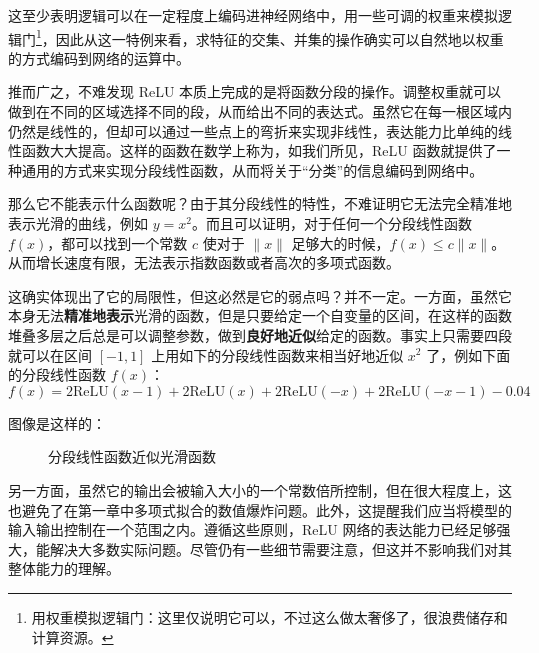 这至少表明逻辑可以在一定程度上编码进神经网络中，用一些可调的权重来模拟逻辑门\footnote{用权重模拟逻辑门：这里仅说明它可以，不过这么做太奢侈了，很浪费储存和计算资源。}，因此从这一特例来看，求特征的交集、并集的操作确实可以自然地以权重的方式编码到网络的运算中。

推而广之，不难发现 ReLU 本质上完成的是将函数分段的操作。调整权重就可以做到在不同的区域选择不同的段，从而给出不同的表达式。虽然它在每一根区域内仍然是线性的，但却可以通过一些点上的弯折来实现非线性，表达能力比单纯的线性函数大大提高。这样的函数在数学上称为，如我们所见，ReLU 函数就提供了一种通用的方式来实现分段线性函数，从而将关于“分类”的信息编码到网络中。

那么它不能表示什么函数呢？由于其分段线性的特性，不难证明它无法完全精准地表示光滑的曲线，例如 $y = x^2$。而且可以证明，对于任何一个分段线性函数 $f(x)$，都可以找到一个常数 $c$ 使对于 $\|x\|$ 足够大的时候，$f(x) \leq c\|x\|$。从而增长速度有限，无法表示指数函数或者高次的多项式函数。

这确实体现出了它的局限性，但这必然是它的弱点吗？并不一定。一方面，虽然它本身无法\textbf{精准地表示}光滑的函数，但是只要给定一个自变量的区间，在这样的函数堆叠多层之后总是可以调整参数，做到\textbf{良好地近似}给定的函数。事实上只需要四段就可以在区间 $[-1, 1]$ 上用如下的分段线性函数来相当好地近似 $x^2$ 了，例如下面的分段线性函数 $f(x)$：
\[
    f(x) = 2\text{ReLU}(x-1) + 2\text{ReLU}(x) + 2\text{ReLU}(-x) + 2\text{ReLU}(-x-1) - 0.04 
\]

图像是这样的：
\begin{figure}[H]
\centering
{}
\caption{分段线性函数近似光滑函数}
\end{figure}

另一方面，虽然它的输出会被输入大小的一个常数倍所控制，但在很大程度上，这也避免了在第一章中多项式拟合的数值爆炸问题。此外，这提醒我们应当将模型的输入输出控制在一个范围之内。遵循这些原则，ReLU 网络的表达能力已经足够强大，能解决大多数实际问题。尽管仍有一些细节需要注意，但这并不影响我们对其整体能力的理解。

